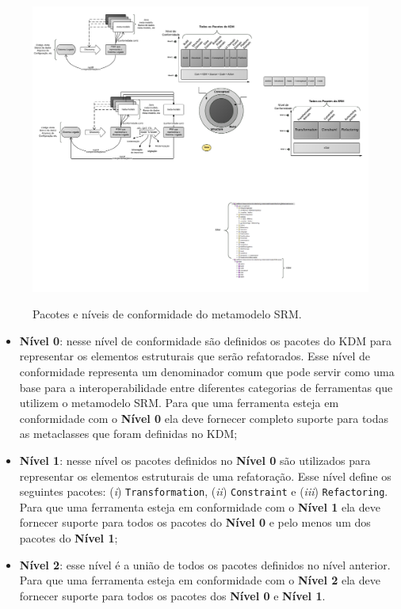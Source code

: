 \begin{figure}[h]
	\centering
		\caption{Pacotes e níveis de conformidade do metamodelo SRM.}
	\includegraphics[scale=1]{images/pacotesSRM}
	\label{fig:pacotes_SRM_conformidade_level}
	\fautor
\end{figure}

\begin{itemize}
    \item \textbf{Nível 0}: nesse nível de conformidade são definidos os pacotes do KDM para representar os elementos estruturais que serão refatorados. Esse nível de conformidade representa um denominador comum que pode servir como uma base para a interoperabilidade entre diferentes categorias de ferramentas que utilizem o metamodelo SRM. Para que uma ferramenta esteja em conformidade com o \textbf{Nível 0} ela deve fornecer completo suporte para todas as metaclasses que foram definidas no KDM;
    \item \textbf{Nível 1}: nesse nível os pacotes definidos no \textbf{Nível 0} são utilizados para representar os elementos estruturais de uma refatoração. Esse nível define os seguintes pacotes: (\textit{i}) \texttt{Transformation}, (\textit{ii}) \texttt{Constraint} e (\textit{iii}) \texttt{Refactoring}. Para que uma ferramenta esteja em conformidade com o \textbf{Nível 1} ela deve fornecer suporte para todos os pacotes do \textbf{Nível 0} e pelo menos um dos pacotes do \textbf{Nível 1};
    \item \textbf{Nível 2}: esse nível é a união de todos os pacotes definidos no nível anterior. Para que uma ferramenta esteja em conformidade com o \textbf{Nível 2} ela deve fornecer suporte para todos os pacotes dos \textbf{Nível 0} e \textbf{Nível 1}.
\end{itemize}

